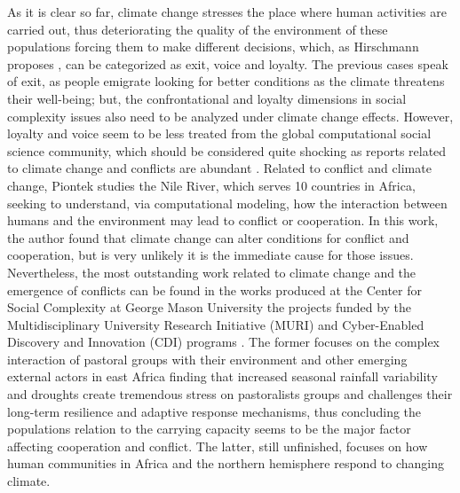 \documentclass{article}
\begin{document}
As it is clear so far, climate change stresses the place where human activities are carried out, thus deteriorating the quality of the environment of these populations forcing them to make different decisions, which, as Hirschmann proposes \cite{hirschman_exit_1970}, can be categorized as exit, voice and loyalty. The previous cases speak of exit, as people emigrate looking for better conditions as the climate threatens their well-being; but, the confrontational and loyalty dimensions in social complexity issues also need to be analyzed under climate change effects. However, loyalty and voice seem to be less treated from the global computational social science community, which should be considered quite shocking as reports related to climate change and conflicts are abundant \cite{hendrix_climate_2012,hsiang_quantifying_2013,steinbruner_climate_2013}. Related to conflict and climate change, Piontek \cite{piontek_impact_2010} studies the Nile River, which serves 10 countries in Africa, seeking to understand, via computational modeling, how the interaction between humans and the environment may lead to conflict or cooperation. In this work, the author found that climate change can alter conditions for conflict and cooperation, but is very unlikely it is the immediate cause for those issues. Nevertheless, the most outstanding work related to climate change and the emergence of conflicts can be found in the works produced at the Center for Social Complexity at George Mason University the projects funded by the Multidisciplinary University Research Initiative (MURI) and Cyber-Enabled Discovery and Innovation (CDI) programs \cite{cioffi-revilla_methodology_2010,hailegiorgis_agent_2010,kennedy_agent-based_2010}. The former focuses on the complex interaction of pastoral groups with their environment and other emerging external actors in east Africa finding that increased seasonal rainfall variability and droughts create tremendous stress on pastoralists groups and challenges their long-term resilience and adaptive response mechanisms, thus concluding the population\textquotesingle s relation to the carrying capacity seems to be the major factor affecting cooperation and conflict. The latter, still unfinished, focuses on how human communities in Africa and the northern hemisphere respond to changing climate.  
\end{document}
